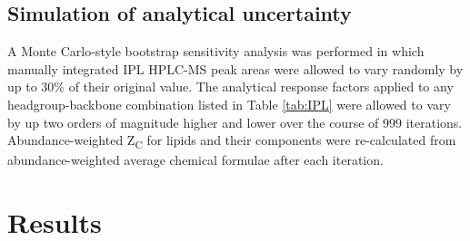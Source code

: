 \subsection{Simulation of analytical uncertainty} A Monte Carlo-style bootstrap sensitivity analysis was performed in which manually integrated IPL HPLC-MS peak areas were allowed to vary randomly by up to 30\% of their original value. The analytical response factors applied to any headgroup-backbone combination listed in Table \ref{tab:IPL} were allowed to vary by up two orders of magnitude higher and lower over the course of 999 iterations. Abundance-weighted Z\textsubscript{C} for lipids and their components were re-calculated from abundance-weighted average chemical formulae after each iteration.


\section{Results}

